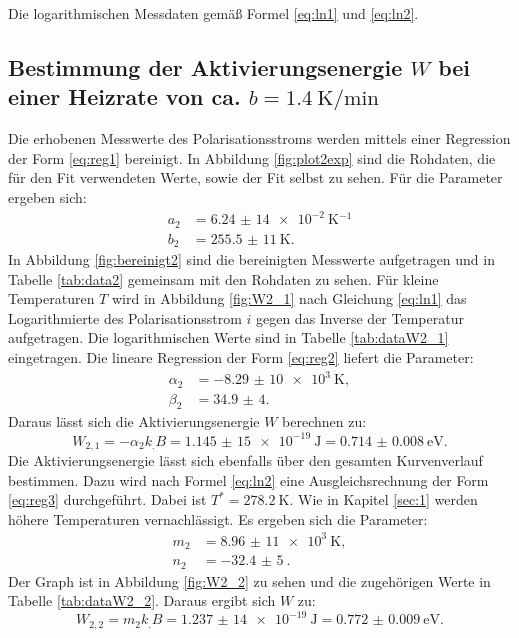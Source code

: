 \begin{table}
\caption{Die logarithmischen Messdaten gemäß Formel \eqref{eq:ln1} und \eqref{eq:ln2}.}
\begin{minipage}[t]{0.5\textwidth}
	\centering
	
	\label{tab:dataW1_1}
\end{minipage}
\begin{minipage}[t]{0.5\textwidth}
	\centering
	
	\label{tab:dataW1_2}
\end{minipage}
\end{table}


\subsection{Bestimmung der Aktivierungsenergie $W$ bei einer Heizrate von ca. $b=\SI{1,4}{\kelvin\per\minute}$}

Die erhobenen Messwerte des Polarisationsstroms werden mittels einer Regression der Form \eqref{eq:reg1} bereinigt. In Abbildung \ref{fig:plot2exp} sind die Rohdaten, die für den Fit verwendeten Werte, sowie der Fit selbst zu sehen.
Für die Parameter ergeben sich:
\begin{align*}
a_2&=\SI{6,24(14)e-2}{\kelvin^{-1}}\\
b_2&=\SI{255,5(11)}{\kelvin}\text{.}
\end{align*}
In Abbildung \ref{fig:bereinigt2} sind die bereinigten Messwerte aufgetragen und in Tabelle \ref{tab:data2} gemeinsam mit den Rohdaten zu sehen.
Für kleine Temperaturen $T$ wird in Abbildung \ref{fig:W2_1} nach Gleichung \eqref{eq:ln1} das Logarithmierte des Polarisationsstrom $i$ gegen das Inverse der Temperatur aufgetragen. Die logarithmischen Werte sind in Tabelle \ref{tab:dataW2_1} eingetragen.
Die lineare Regression der Form \eqref{eq:reg2} liefert die Parameter:
\begin{align*}
\alpha_2&=\SI{-8,29(10)e3}{\kelvin},\\
\beta_2 &= \num{34,9(4)}\text{.}
\end{align*}
Daraus lässt sich die Aktivierungsenergie $W$ berechnen zu:
\[
W_{2,1} = -\alpha_2 k_.B =\SI{1,145(15)e-19}{\joule}=\SI{0.714(8)}{\electronvolt}\text{.}
\]
Die Aktivierungsenergie lässt sich ebenfalls über den gesamten Kurvenverlauf bestimmen. Dazu wird nach Formel \eqref{eq:ln2} eine Ausgleichsrechnung der Form \eqref{eq:reg3} durchgeführt. Dabei ist $T^*=\SI{278,2}{\kelvin}$. Wie in Kapitel \ref{sec:1} werden höhere Temperaturen vernachlässigt. Es ergeben sich die Parameter:
\begin{align*}
m_2&=\SI{8,96(11)e3}{\kelvin},\\
n_2&=\SI{-32,4(5)}{}\text{.}
\end{align*}
Der Graph ist in Abbildung \ref{fig:W2_2} zu sehen und die zugehörigen Werte in Tabelle \ref{tab:dataW2_2}.
Daraus ergibt sich $W$ zu:
\[
W_{2,2} = m_2 k_.B =\SI{1,237(14)e-19}{\joule}=\SI{0.772(9)}{\electronvolt}\text{.}
\]

